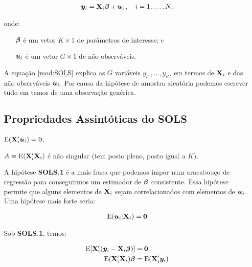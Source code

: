 \documentclass[11pt, oneside, a4paper, article]{article}
\numberwithin{equation}{section}
\begin{document}
\vspace{-1 em}
\begin{align}\label{mod:SOLS}
	\boldsymbol{y}_{i} = \mathbf{X}_{i} \boldsymbol{\beta} + \boldsymbol{u}_{i} \, , \quad i=1, \dots, N,
\end{align}

\noindent
onde:

\vspace{-1 em}
\begin{itemize}[itemsep = -1ex]
\item [$\boldsymbol{\beta}$] é um vetor $K \times 1$ de parâmetros de interesse; e
\item [$\boldsymbol{u}_{i}$] é um vetor $G \times 1$ de não observáveis.
\end{itemize}

A equação \eqref{mod:SOLS} explica as $G$ variáveis $y_{i1}, \dots, y_{iG}$ em termos de $\mathbf{X}_{i}$ e das não observáveis $\boldsymbol{u}_{i}$.
Por causa da hipótese de amostra aleatória podemos escrever tudo em temos de uma observação genérica.

\subsection{Propriedades Assintóticas do SOLS}
\noindent
\citet[Sec.7.3.1]{wool-2010}

\begin{description}[itemsep = 0ex]
\item [SOLS.1] $\text{E}(\mathbf{X}_{i}' \boldsymbol{u}_{i}) = 0$.
		
\item [SOLS.2] $A \equiv \text{E}( \mathbf{X}_{i}' \mathbf{X}_{i} )$ é não singular (tem posto pleno, posto igual a $K$). 
\end{description}

A hipótese \textbf{SOLS.1} é a mais fraca que podemos impor num aracabouço de regressão para conseguirmos um estimador de $\boldsymbol{\beta}$ consistente.
Essa hipótese permite que alguns elementos de $\mathbf{X}_{i}$ sejam correlacionados com elementos de $\boldsymbol{u}_{i}$.
Uma hipótese mais forte seria:

\vspace{-1 em}
\begin{align} \label{cond:mean:0}
	\text{E}(\boldsymbol{u}_{i} | \mathbf{X}_{i} ) = \boldsymbol{0}
\end{align}

Sob \textbf{SOLS.1}, temos:

\vspace{-1 em}
\begin{align*} 
\text{E}[ \mathbf{X}_{i}' ( \boldsymbol{y}_{i} - \mathbf{X}_{i} \boldsymbol{\beta} ) ] &= \boldsymbol{0}
\\
\text{E}( \mathbf{X}_{i}' \mathbf{X}_{i} ) \boldsymbol{\beta} &= \text{E}( \mathbf{X}_{i}' \boldsymbol{y}_{i} )  
\end{align*}
\end{document}

